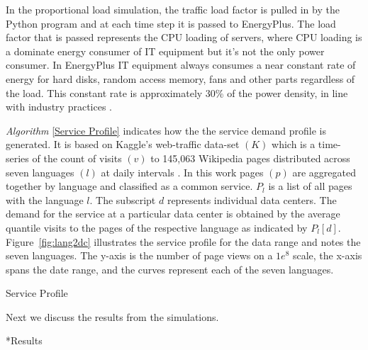 \documentclass[twocolumn, a4paper,10pt]{article}
\makeatletter
\renewcommand\section{\@startsection{section}{1}{\z@}{0.25cm}{0.1cm}{\normalfont\large\bfseries}}
\makeatother
\begin{document}
In the proportional load simulation, the traffic load factor is pulled in by the Python program and at each time step it is passed to EnergyPlus. The load factor that is passed represents the CPU loading of servers, where CPU loading is a dominate energy consumer of IT equipment but it’s not the only power consumer. In EnergyPlus IT equipment always consumes a near constant rate of energy for hard disks, random access memory, fans and other parts regardless of the load. This constant rate is approximately 30\% of the power density, in line with industry practices \citep{barroso18}. 

\textit{Algorithm} \ref{Service Profile} indicates how the the service demand profile is generated. It is based on Kaggle's web-traffic data-set $(K)$ which is a time-series of the count of visits $(v)$ to 145,063 Wikipedia pages distributed across seven languages $(l)$ at daily intervals \citep{kaggle17}. In this work  pages $(p)$ are aggregated together by language and classified as a common service. $P_l$ is a list of all pages with the language $l$. The subscript $d$ represents individual data centers.  The demand for the service at a particular data center is obtained by the average quantile visits to the pages of the respective language as indicated by $P_{l}[d]$.  Figure~\ref{fig:lang2dc} illustrates the service profile for the data range and notes the seven languages. The y-axis is the number of page views on a $1e^8$ scale, the x-axis spans the date range, and the curves represent each of the seven languages.

\begin{algorithm}
\caption{Service Profile}
\begin{algorithmic}[1]
	\ENDFOR
	\ENDFOR
\end{algorithmic}
\label{Service Profile}
\end{algorithm}

Next we discuss the results from the simulations. 

\section*{Results}
\end{document}
